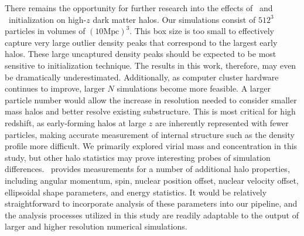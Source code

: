 There remains the opportunity for further research into the effects of \za\ and \lpt\ initialization on high-$z$ dark matter halos.  Our simulations consist of $512^{3}$ particles in volumes of $(10 \mathrm{Mpc})^{3}$.  This box size is too small to effectively capture very large outlier density peaks that correspond to the largest early halos.  These large uncaptured density peaks should be expected to be most sensitive to initialization technique.  The results in this work, therefore, may even be dramatically underestimated.  Additionally, as computer cluster hardware continues to improve, larger $N$ simulations become more feasible.  A larger particle number would allow the increase in resolution needed to consider smaller mass halos and better resolve existing substructure.  This is most critical for high redshift, as early-forming halos at large $z$ are inherently represented with fewer particles, making accurate measurement of internal structure such as the density profile more difficult.  We primarily explored virial mass and concentration in this study, but other halo statistics may prove interesting probes of simulation differences.  \rockstar\ provides measurements for a number of additional halo properties, including angular momentum, spin, nuclear position offset, nuclear velocity offset, ellipsoidal shape parameters, and energy statistics.  It would be relatively straightforward to incorporate analysis of these parameters into our pipeline, and the analysis processes utilized in this study are readily adaptable to the output of larger and higher resolution numerical simulations.




